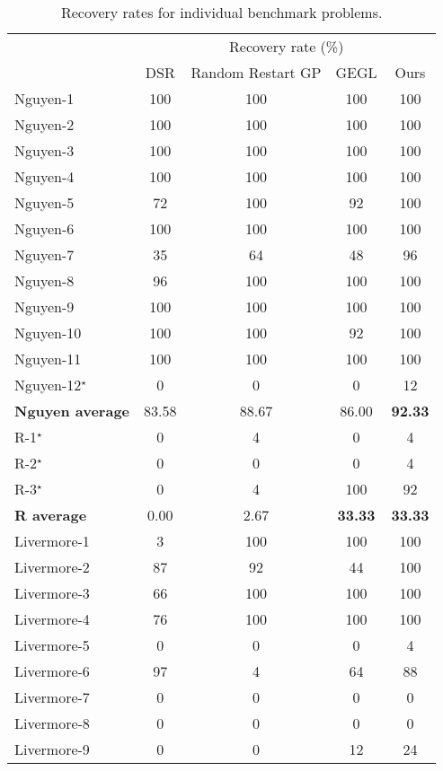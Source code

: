 \documentclass{article}
\begin{document}
\begin{table}[htbp]
  \centering
  \caption{Recovery rates for individual benchmark problems.}
    \begin{tabular}{lcccc}
    & \multicolumn{4}{c}{Recovery rate (\%)} \\
    & DSR & Random Restart GP & GEGL & Ours \\
    \cmidrule{2-5}
    Nguyen-1 & 100 & 100 & 100 & 100 \\
    Nguyen-2 & 100 & 100 & 100 & 100 \\
    Nguyen-3 & 100 & 100 & 100 & 100 \\
    Nguyen-4 & 100 & 100 & 100 & 100 \\
    Nguyen-5 & 72  & 100& 92  & 100 \\
    Nguyen-6 & 100 & 100 & 100 & 100 \\
    Nguyen-7 & 35  & 64  & 48  & 96 \\
    Nguyen-8 & 96  & 100 & 100 & 100 \\
    Nguyen-9 & 100 & 100 & 100 & 100 \\
    Nguyen-10 & 100 & 100 & 92  & 100 \\
    Nguyen-11 & 100 & 100 & 100 & 100 \\
    Nguyen-12$^\star$ & 0   & 0   & 0   & 12 \\
    \midrule
    \textbf{Nguyen average} & 83.58 & 88.67 & 86.00 & \textbf{92.33} \\
    \midrule
    R-1$^\star$   & 0   & 4   & 0   & 4 \\
    R-2$^\star$   & 0   & 0   & 0   & 4 \\
    R-3$^\star$   & 0   & 4   & 100 & 92 \\
    \midrule
    \textbf{R average} & 0.00 & 2.67 & \textbf{33.33} & \textbf{33.33} \\
    \midrule
    Livermore-1 & 3   & 100 & 100 & 100 \\
    Livermore-2 & 87  & 92  & 44  & 100 \\
    Livermore-3 & 66  & 100 & 100 & 100 \\
    Livermore-4 & 76  & 100 & 100 & 100 \\
    Livermore-5 & 0   & 0   & 0   & 4 \\
    Livermore-6 & 97  & 4   & 64  & 88 \\
    Livermore-7 & 0   & 0   & 0   & 0 \\
    Livermore-8 & 0   & 0   & 0   & 0 \\
    Livermore-9 & 0   & 0   & 12  & 24 \\

\end{tabular}
\end{table}
\end{document}
